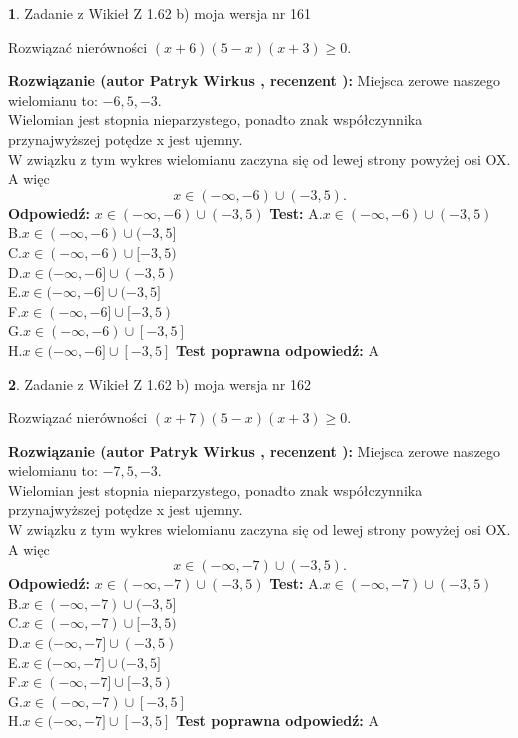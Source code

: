 \documentclass[12pt, a4paper]{article}
\theoremstyle{definition} %
\newtheorem{zad}{}
\newcommand{\zadStart}[1]{\begin{zad}#1\newline}
\newcommand{\zadStop}{\end{zad}}
\newcommand{\rozwStart}[2]{\noindent \textbf{Rozwiązanie (autor #1 , recenzent #2): }\newline}
\newcommand{\rozwStop}{\newline}
\newcommand{\odpStart}{\noindent \textbf{Odpowiedź:}\newline}
\newcommand{\odpStop}{\newline}
\newcommand{\testStart}{\noindent \textbf{Test:}\newline}
\newcommand{\testStop}{\newline}
\newcommand{\kluczStart}{\noindent \textbf{Test poprawna odpowiedź:}\newline}
\newcommand{\kluczStop}{\newline}
\begin{document}
\zadStart{Zadanie z Wikieł Z 1.62 b) moja wersja nr 161}

Rozwiązać nierówności $(x+6)(5-x)(x+3)\ge0$.
\zadStop
\rozwStart{Patryk Wirkus}{}
Miejsca zerowe naszego wielomianu to: $-6, 5, -3$.\\
Wielomian jest stopnia nieparzystego, ponadto znak współczynnika przy\linebreak najwyższej potędze x jest ujemny.\\ W związku z tym wykres wielomianu zaczyna się od lewej strony powyżej osi OX. A więc $$x \in (-\infty,-6) \cup (-3,5).$$
\rozwStop
\odpStart
$x \in (-\infty,-6) \cup (-3,5)$
\odpStop
\testStart
A.$x \in (-\infty,-6) \cup (-3,5)$\\
B.$x \in (-\infty,-6) \cup (-3,5]$\\
C.$x \in (-\infty,-6) \cup [-3,5)$\\
D.$x \in (-\infty,-6] \cup (-3,5)$\\
E.$x \in (-\infty,-6] \cup (-3,5]$\\
F.$x \in (-\infty,-6] \cup [-3,5)$\\
G.$x \in (-\infty,-6) \cup [-3,5]$\\
H.$x \in (-\infty,-6] \cup [-3,5]$
\testStop
\kluczStart
A
\kluczStop



\zadStart{Zadanie z Wikieł Z 1.62 b) moja wersja nr 162}

Rozwiązać nierówności $(x+7)(5-x)(x+3)\ge0$.
\zadStop
\rozwStart{Patryk Wirkus}{}
Miejsca zerowe naszego wielomianu to: $-7, 5, -3$.\\
Wielomian jest stopnia nieparzystego, ponadto znak współczynnika przy\linebreak najwyższej potędze x jest ujemny.\\ W związku z tym wykres wielomianu zaczyna się od lewej strony powyżej osi OX. A więc $$x \in (-\infty,-7) \cup (-3,5).$$
\rozwStop
\odpStart
$x \in (-\infty,-7) \cup (-3,5)$
\odpStop
\testStart
A.$x \in (-\infty,-7) \cup (-3,5)$\\
B.$x \in (-\infty,-7) \cup (-3,5]$\\
C.$x \in (-\infty,-7) \cup [-3,5)$\\
D.$x \in (-\infty,-7] \cup (-3,5)$\\
E.$x \in (-\infty,-7] \cup (-3,5]$\\
F.$x \in (-\infty,-7] \cup [-3,5)$\\
G.$x \in (-\infty,-7) \cup [-3,5]$\\
H.$x \in (-\infty,-7] \cup [-3,5]$
\testStop
\kluczStart
A
\kluczStop
\end{document}
